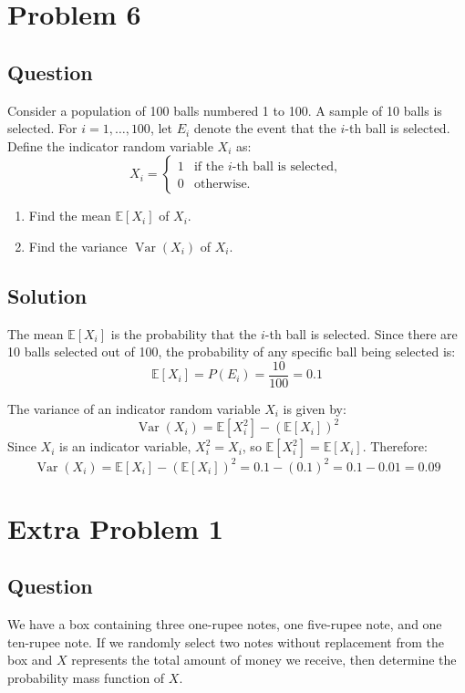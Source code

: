 \documentclass{article}
\begin{document}
\section*{Problem 6}
\subsection*{Question}
Consider a population of 100 balls numbered 1 to 100. A sample of 10 balls is selected. For \(i = 1, \ldots, 100\), let \(E_i\) denote the event that the \(i\)-th ball is selected. Define the indicator random variable \(X_i\) as:
\[
X_i = 
\begin{cases} 
1 & \text{if the } i\text{-th ball is selected}, \\
0 & \text{otherwise}.
\end{cases}
\]

\begin{enumerate}
    \item Find the mean \(\mathbb{E}[X_i]\) of \(X_i\).
    \item Find the variance \(\operatorname{Var}(X_i)\) of \(X_i\).
\end{enumerate}
\subsection*{Solution}


The mean \(\mathbb{E}[X_i]\) is the probability that the \(i\)-th ball is selected. Since there are 10 balls selected out of 100, the probability of any specific ball being selected is:
\[
\mathbb{E}[X_i] = P(E_i) = \frac{10}{100} = 0.1
\]

The variance of an indicator random variable \(X_i\) is given by:
\[
\operatorname{Var}(X_i) = \mathbb{E}[X_i^2] - (\mathbb{E}[X_i])^2
\]
Since \(X_i\) is an indicator variable, \(X_i^2 = X_i\), so \(\mathbb{E}[X_i^2] = \mathbb{E}[X_i]\). Therefore:
\[
\operatorname{Var}(X_i) = \mathbb{E}[X_i] - (\mathbb{E}[X_i])^2 = 0.1 - (0.1)^2 = 0.1 - 0.01 = 0.09
\]
\section*{Extra Problem 1}
\subsection*{Question}
We have a box containing three one-rupee notes, one five-rupee note, and one ten-rupee note. If we randomly select two notes without replacement from the box and \(X\) represents the total amount of money we receive, then determine the probability mass function of \(X\).
\end{document}

